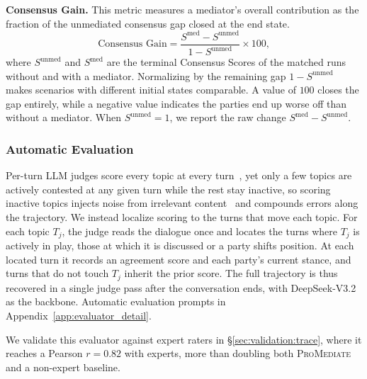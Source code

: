 \documentclass{llmxive}
\begin{document}
\smallskip\smallskip\noindent\textbf{{Consensus Gain.}} This metric measures a mediator's overall contribution as the fraction of the unmediated consensus gap closed at the end state.
\[\text{Consensus Gain} =
\frac{S^\mathrm{med} - S^\mathrm{unmed}}{1 - S^\mathrm{unmed}} \times 100,\]
where $S^\mathrm{unmed}$ and $S^\mathrm{med}$ are the terminal Consensus Scores of the matched runs without and with a mediator. Normalizing by the remaining gap $1 - S^\mathrm{unmed}$ makes scenarios with different initial states comparable. A value of $100$ closes the gap entirely, while a negative value indicates the parties end up worse off than without a mediator. When $S^\mathrm{unmed} = 1$, we report the raw change $S^\mathrm{med} - S^\mathrm{unmed}$.



\subsubsection{Automatic Evaluation}
\label{sec:method:evaluation:auto}

Per-turn LLM judges score every topic at every turn~\citep{liu2025promediate}, yet only a few topics are actively contested at any given turn while the rest stay inactive, so scoring inactive topics injects noise from irrelevant content~\citep{koo2024benchmarking, ye2025justice} and compounds errors along the trajectory. We instead localize scoring to the turns that move each topic. For each topic $T_j$, the judge reads the dialogue once and locates the turns where $T_j$ is actively in play, those at which it is discussed or a party shifts position. At each located turn it records an agreement score and each party's current stance, and turns that do not touch $T_j$ inherit the prior score. The full trajectory is thus recovered in a single judge pass after the conversation ends, with DeepSeek-V3.2 as the backbone. Automatic evaluation prompts in Appendix~\ref{app:evaluator_detail}.

We validate this evaluator against expert raters in \S\ref{sec:validation:trace}, where it reaches a Pearson $r = 0.82$ with experts, more than doubling both \textsc{ProMediate}~\citep{liu2025promediate} and a non-expert baseline.




\end{document}
